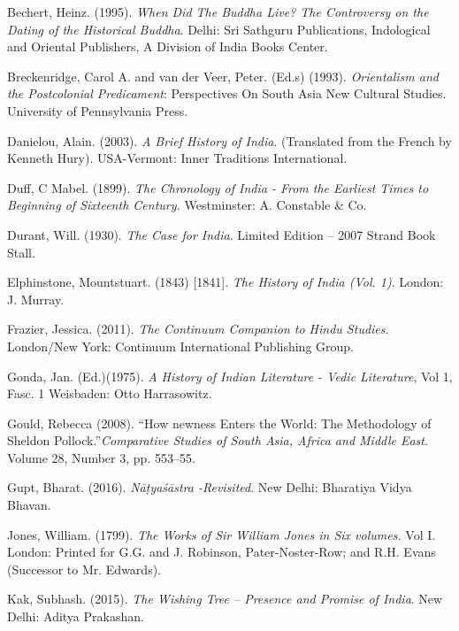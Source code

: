 \begin{thebibliography}{99}
\itemsep=1pt
 Bechert, Heinz. (1995). \textit{When Did The Buddha Live? The Controversy on the Dating of the Historical Buddha}. Delhi: Sri Sathguru Publications, Indological and Oriental Publishers, A Division of India Books Center.

  Breckenridge, Carol A. and van der Veer, Peter. (Ed.s) (1993). \textit{Orientalism and the Postcolonial Predicament}: Perspectives On South Asia New Cultural Studies. University of Pennsylvania Press.

  Danielou, Alain. (2003). \textit{A Brief History of India}. (Translated from the French by Kenneth Hury). USA-Vermont: Inner Traditions International.

  Duff, C Mabel. (1899). \textit{The Chronology of India - From the Earliest Times to Beginning of Sixteenth Century.} Westminster: A. Constable \& Co.

  Durant, Will. (1930). \textit{The Case for India}. Limited Edition – 2007 Strand Book Stall.

  Elphinstone, Mountstuart. (1843) [1841]. \textit{The History of India (Vol. 1)}. London: J. Murray.

  Frazier, Jessica. (2011). \textit{The Continuum Companion to Hindu Studies.} London/New York: Continuum International Publishing Group.

  Gonda, Jan. (Ed.)(1975). \textit{A History of Indian Literature - Vedic Literature}, Vol 1, Fasc. 1 Weisbaden: Otto Harrasowitz.

  Gould, Rebecca (2008). “How newness Enters the World: The Methodology of Sheldon Pollock.”\textit{Comparative Studies of South Asia, Africa and Middle East}. Volume 28, Number 3, pp. 553--55.

  Gupt, Bharat. (2016). \textit{Nāṭyaśāstra -Revisited}. New Delhi: Bharatiya Vidya Bhavan.

  Jones, William. (1799). \textit{ The Works of Sir William Jones in Six volumes.} Vol I. London: Printed for G.G. and J. Robinson, Pater-Noster-Row; and R.H. Evans (Successor to Mr. Edwards).

  Kak, Subhash. (2015). \textit{The Wishing Tree – Presence and Promise of India}. New Delhi: Aditya Prakashan.


\end{thebibliography}
